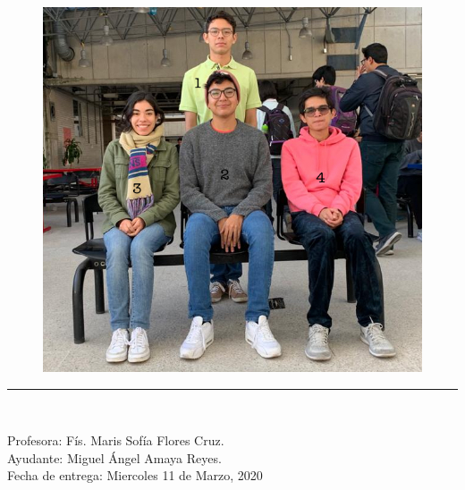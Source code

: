 \documentclass[letterpaper, 11 pt]{article}
\begin{document}
\begin{center}
\paragraph{}
\begin{figure}[H]
    \captionsetup{justification=centering,margin=2cm}
    \includegraphics[scale=0.23]{uwu.jpg}
    \centering
\end{figure}
\rule{80mm}{0.1mm}\\
\begin{large}
Profesora:  Fís. Maris Sofía Flores Cruz.  \\
Ayudante: Miguel Ángel Amaya Reyes. \\
Fecha de entrega: Miercoles 11 de Marzo, 2020\\
\end{large}
\end{center}

\newpage

\end{document}
